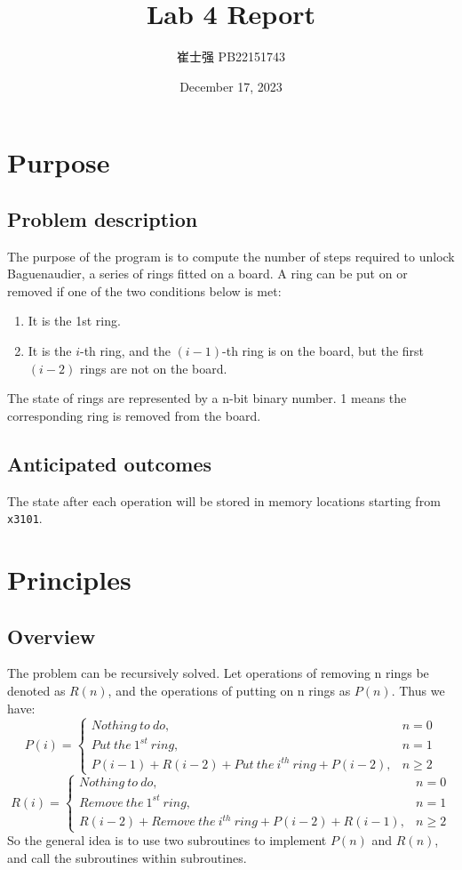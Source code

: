 \documentclass[UTF8]{ctexart}
\title{Lab 4 Report}
\author{崔士强 PB22151743}
\date{December 17, 2023}
\begin{document}
\maketitle
\section{Purpose}
\subsection{Problem description}
The purpose of the program is to compute the number of steps required to
unlock Baguenaudier, a series of rings fitted on a board. A ring can be put on or removed if one of the two conditions below is met:
\begin{enumerate}
  \item It is the 1st ring.
  \item It is the $i$-th ring, and the $(i-1)$-th ring is on the board, but the first $(i-2)$ rings are not on the board.
\end{enumerate}

The state of rings are represented by a n-bit binary number. 1 means the corresponding ring is removed from the board. 
\subsection{Anticipated outcomes}
The state after each operation will be stored in memory locations starting from \lstinline{x3101}.

\section{Principles}
\subsection{Overview}
The problem can be recursively solved. Let operations of removing n rings be denoted as $R(n)$, 
and the operations of putting on n rings as $P(n)$. Thus we have:
\begin{equation}
  P(i)=
  \begin{cases}
    Nothing\ to\ do,& n=0 \\
    Put\ the\ 1^{st}\ ring,& n=1 \\
    P(i-1)+R(i-2)+Put\ the\ i^{th}\ ring+P(i-2),& n\geq  2
  \end{cases}
\end{equation}
\begin{equation}
  R(i)=
  \begin{cases}
    Nothing\ to\ do,& n=0 \\
    Remove\ the\ 1^{st}\ ring,& n=1 \\
    R(i-2)+Remove\ the\ i^{th}\ ring+P(i-2)+R(i-1),& n\geq  2 
  \end{cases}
\end{equation}
So the general idea is to use two subroutines to implement $P(n)$ and $R(n)$, and call the 
subroutines within subroutines.
\end{document}
